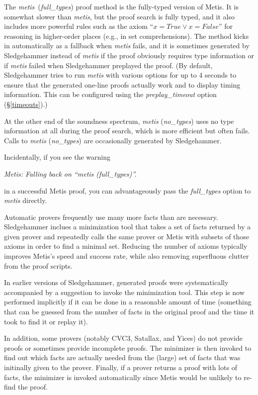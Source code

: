 \documentclass[a4paper,12pt]{article}
\begin{document}
The \textit{metis}~(\textit{full\_types}) proof method is the fully-typed
version of Metis. It is somewhat slower than \textit{metis}, but the proof
search is fully typed, and it also includes more powerful rules such as the
axiom ``$x = \mathit{True} \mathrel{\lor} x = \mathit{False}$'' for reasoning in
higher-order places (e.g., in set comprehensions). The method kicks in
automatically as a fallback when \textit{metis} fails, and it is sometimes
generated by Sledgehammer instead of \textit{metis} if the proof obviously
requires type information or if \textit{metis} failed when Sledgehammer
preplayed the proof. (By default, Sledgehammer tries to run \textit{metis} with
various options for up to 4 seconds to ensure that the generated one-line proofs
actually work and to display timing information. This can be configured using
the \textit{preplay\_timeout} option (\S\ref{timeouts}).)

At the other end of the soundness spectrum, \textit{metis} (\textit{no\_types})
uses no type information at all during the proof search, which is more efficient
but often fails. Calls to \textit{metis} (\textit{no\_types}) are occasionally
generated by Sledgehammer.

Incidentally, if you see the warning

\prew
\slshape
Metis: Falling back on ``\textit{metis} (\textit{full\_types})''.
\postw

in a successful Metis proof, you can advantageously pass the
\textit{full\_types} option to \textit{metis} directly.


Automatic provers frequently use many more facts than are necessary.
Sledgehammer inclues a minimization tool that takes a set of facts returned by a
given prover and repeatedly calls the same prover or Metis with subsets of those
axioms in order to find a minimal set. Reducing the number of axioms typically
improves Metis's speed and success rate, while also removing superfluous clutter
from the proof scripts.

In earlier versions of Sledgehammer, generated proofs were systematically
accompanied by a suggestion to invoke the minimization tool. This step is now
performed implicitly if it can be done in a reasonable amount of time (something
that can be guessed from the number of facts in the original proof and the time
it took to find it or replay it).

In addition, some provers (notably CVC3, Satallax, and Yices) do not provide
proofs or sometimes provide incomplete proofs. The minimizer is then invoked to
find out which facts are actually needed from the (large) set of facts that was
initinally given to the prover. Finally, if a prover returns a proof with lots
of facts, the minimizer is invoked automatically since Metis would be unlikely
to re-find the proof.
\end{document}
